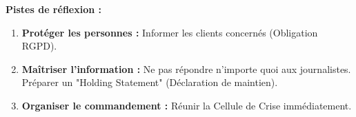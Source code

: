 \textbf{Pistes de réflexion :}
\begin{enumerate}
    \item \textbf{Protéger les personnes :} Informer les clients concernés (Obligation RGPD).
    \item \textbf{Maîtriser l'information :} Ne pas répondre n'importe quoi aux journalistes. Préparer un "Holding Statement" (Déclaration de maintien).
    \item \textbf{Organiser le commandement :} Réunir la Cellule de Crise immédiatement.
\end{enumerate}


